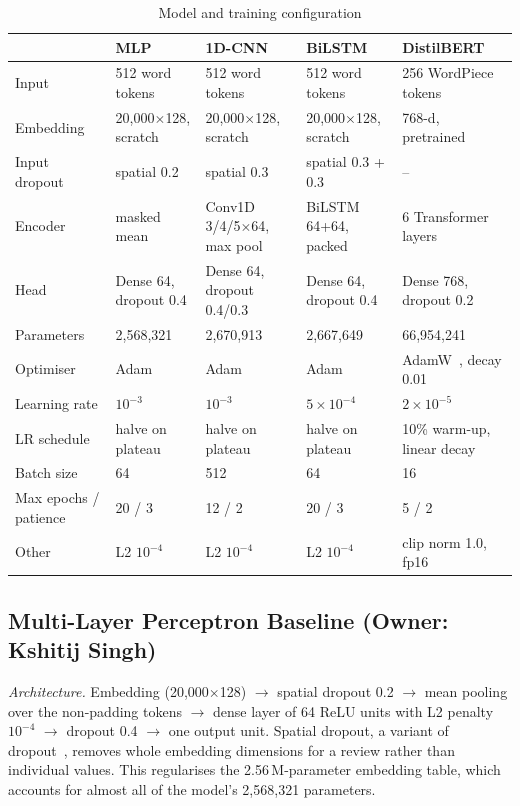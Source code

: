 \documentclass[conference,onecolumn,a4paper,10pt]{IEEEtran}
\begin{document}
\begin{table}[!t]
\caption{Model and training configuration}\label{tab:config}
\centering\footnotesize\renewcommand{\arraystretch}{1.15}
\begin{tabularx}{\linewidth}{@{}L{2.9cm}YYYY@{}}
\toprule
 & \textbf{\color{mMLP}MLP} & \textbf{\color{mCNN}1D-CNN} & \textbf{\color{mLSTM}BiLSTM} & \textbf{\color{mBERT}DistilBERT} \\
\midrule
Input & 512 word tokens & 512 word tokens & 512 word tokens & 256 WordPiece tokens \\
Embedding & 20,000$\times$128, scratch & 20,000$\times$128, scratch & 20,000$\times$128, scratch & 768-d, pretrained \\
Input dropout & spatial 0.2 & spatial 0.3 & spatial 0.3 + 0.3 & -- \\
Encoder & masked mean & Conv1D 3/4/5$\times$64, max pool & BiLSTM 64+64, packed & 6 Transformer layers \\
Head & Dense 64, dropout 0.4 & Dense 64, dropout 0.4/0.3 & Dense 64, dropout 0.4 & Dense 768, dropout 0.2 \\
Parameters & 2,568,321 & 2,670,913 & 2,667,649 & 66,954,241 \\
Optimiser & Adam~\cite{kingma2015} & Adam & Adam & AdamW~\cite{loshchilov2019}, decay 0.01 \\
Learning rate & $10^{-3}$ & $10^{-3}$ & $5\times10^{-4}$ & $2\times10^{-5}$ \\
LR schedule & halve on plateau & halve on plateau & halve on plateau & 10\% warm-up, linear decay \\
Batch size & 64 & 512 & 64 & 16 \\
Max epochs / patience & 20 / 3 & 12 / 2 & 20 / 3 & 5 / 2 \\
Other & L2 $10^{-4}$ & L2 $10^{-4}$ & L2 $10^{-4}$ & clip norm 1.0, fp16 \\
\bottomrule
\end{tabularx}
\end{table}

\subsection{Multi-Layer Perceptron Baseline (Owner: Kshitij Singh)}
\textit{Architecture.} Embedding (20,000$\times$128) $\rightarrow$ spatial dropout 0.2 $\rightarrow$ mean pooling over the non-padding tokens $\rightarrow$ dense layer of 64 ReLU units with L2 penalty $10^{-4}$ $\rightarrow$ dropout 0.4 $\rightarrow$ one output unit. Spatial dropout, a variant of dropout~\cite{srivastava2014}, removes whole embedding dimensions for a review rather than individual values. This regularises the 2.56\,M-parameter embedding table, which accounts for almost all of the model's 2,568,321 parameters.
\end{document}
